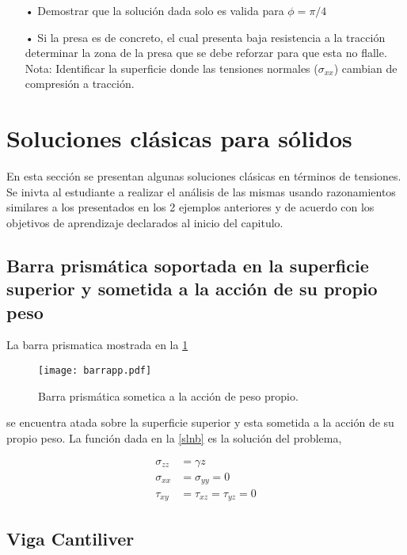 \documentclass[../notas medios.tex]{subfiles}
\begin{document}
\begin{itemize}
\item[•] Demostrar que la solución dada solo es valida para $\phi = \pi/4$
\item[•] Si la presa es de concreto, el cual presenta baja resistencia a la tracción determinar la zona de la presa que se debe reforzar para que esta no flalle. Nota: Identificar la superficie donde las tensiones normales ($\sigma_{xx}$) cambian de compresión a tracción.
\end{itemize}

\section{Soluciones clásicas para sólidos}
En esta sección se presentan algunas soluciones clásicas en términos de tensiones. Se inivta al estudiante a realizar el análisis de las mismas usando razonamientos similares a los presentados en los 2 ejemplos anteriores y de acuerdo con los objetivos de aprendizaje declarados al inicio del capitulo.

\subsection{Barra prismática soportada en la superficie superior y sometida a la acción de su propio peso}

La barra prismatica mostrada en la \cref{barra}

\begin{figure}[H]
\centering
	\texttt{[image: barrapp.pdf]}
	\caption{Barra prismática sometica a la acción de peso propio.}
	\label{barra}
\end{figure}

se encuentra atada sobre la superficie superior y esta sometida a la acción de su propio peso. La función dada en la \cref{slnb} es la solución del problema,


\begin{equation}
\begin{split}
{\sigma _{zz}} & = \gamma z \\
{\sigma _{xx}} & = {\sigma _{yy}} = 0 \\
{\tau _{xy}}   & = {\tau _{xz}} = {\tau _{yz}} = 0
\end{split}
\label{slnb}
\end{equation}


\subsection{Viga Cantiliver}
\end{document}

